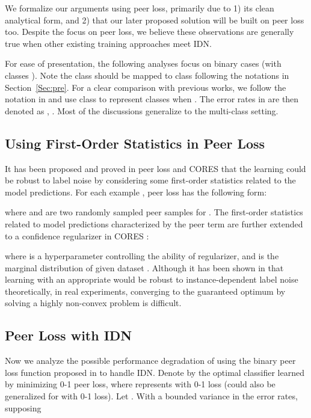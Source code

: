 \documentclass[final]{cvpr}
\newcommand{\rev}[1]{{\color{blue}#1}}
\newcommand{\rev}[1]{#1}
\begin{document}
 We formalize our arguments using peer loss, primarily due to 1) its clean analytical form, and 2) that our later proposed solution will be built on peer loss too. Despite the focus on peer loss, we believe these observations are generally true when other existing training approaches meet IDN. 

For ease of presentation, the following analyses focus on binary cases (with classes ).
Note the class  should be mapped to class  following the notations in Section~\ref{Sec:pre}. 
For a clear comparison with previous works, we follow the notation in \cite{liu2019peer} and use class  to represent classes  when .
The error rates in  are then denoted as , . Most of the discussions generalize to the multi-class setting. 
 
\subsection{Using First-Order Statistics in Peer Loss}\label{sec:first-order-info}

It has been proposed and proved in peer loss \cite{liu2019peer} and CORES \cite{sieve2020} that the learning could be robust to label noise by considering some first-order statistics related to the model predictions.
For each example , peer loss \cite{liu2019peer} has the following form:

where  and  are two randomly sampled peer samples for .
The first-order statistics related to model predictions characterized by the peer term  are further extended to a confidence regularizer in CORES \cite{sieve2020}:

where  is a hyperparameter controlling the ability of regularizer, and {\small } is the marginal distribution of {\small } given dataset {\small }.
Although it has been shown in \cite{sieve2020} that learning with an appropriate  would be robust to instance-dependent label noise theoretically, in real experiments, converging to the guaranteed optimum by solving a highly non-convex problem is difficult.







\subsection{Peer Loss with IDN}\label{sec:pure_peer_IDN}


Now we analyze the possible performance degradation of using the binary peer loss function proposed in \cite{liu2019peer} to handle IDN. 
Denote by  the optimal classifier learned by minimizing 0-1 peer loss, where  represents  with 0-1 loss (could also be generalized for  with 0-1 loss).
\rev{Let .}
With a bounded variance in the error rates, supposing 
\end{document}
